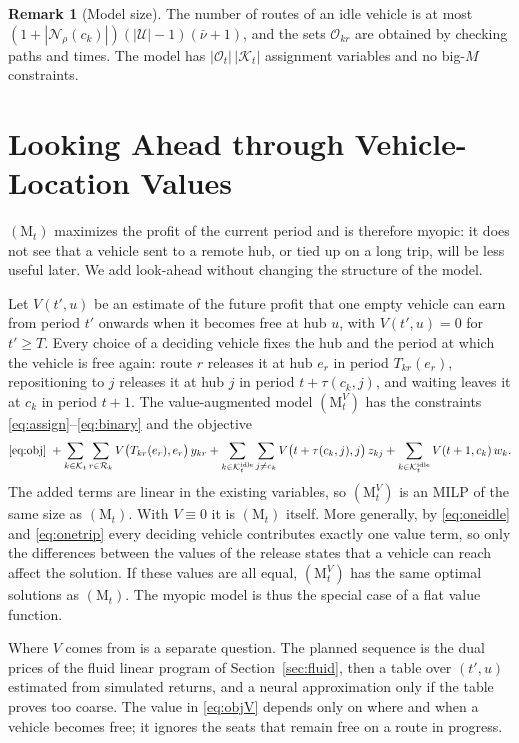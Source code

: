 \documentclass[12pt]{article}
\theoremstyle{plain}
\theoremstyle{definition}
\newtheorem{remark}{Remark}
\newcommand{\Kidle}{\mathcal{K}^{\mathrm{idle}}_t}
\newcommand{\Kdec}{\mathcal{K}_t}
\begin{document}
\begin{remark}[Model size]
The number of routes of an idle vehicle is at most $(1+|\mathcal{N}_\rho(c_k)|)(|\mathcal{U}|-1)(\bar\nu+1)$, and the sets $\mathcal{O}_{kr}$ are obtained by checking paths and times. The model has $|\mathcal{O}_t|\,|\Kdec|$ assignment variables and no big-$M$ constraints.
\end{remark}

\section{Looking Ahead through Vehicle-Location Values}\label{sec:value}

$(\mathrm{M}_t)$ maximizes the profit of the current period and is therefore myopic: it does not see that a vehicle sent to a remote hub, or tied up on a long trip, will be less useful later. We add look-ahead without changing the structure of the model.

Let $V(t',u)$ be an estimate of the future profit that one empty vehicle can earn from period $t'$ onwards when it becomes free at hub $u$, with $V(t',u)=0$ for $t'\ge T$. Every choice of a deciding vehicle fixes the hub and the period at which the vehicle is free again: route $r$ releases it at hub $e_r$ in period $T_{kr}(e_r)$, repositioning to $j$ releases it at hub $j$ in period $t+\tau(c_k,j)$, and waiting leaves it at $c_k$ in period $t+1$. The value-augmented model $(\mathrm{M}^V_t)$ has the constraints \eqref{eq:assign}--\eqref{eq:binary} and the objective
\begin{equation}\label{eq:objV}
\text{\eqref{eq:obj}}\;+\sum_{k\in\Kdec}\sum_{r\in\mathcal{R}_k}V\bigl(T_{kr}(e_r),e_r\bigr)\,y_{kr}
+\sum_{k\in\Kidle}\sum_{j\neq c_k}V\bigl(t+\tau(c_k,j),j\bigr)\,z_{kj}
+\sum_{k\in\Kidle}V(t+1,c_k)\,w_k .
\end{equation}
The added terms are linear in the existing variables, so $(\mathrm{M}^V_t)$ is an MILP of the same size as $(\mathrm{M}_t)$. With $V\equiv 0$ it is $(\mathrm{M}_t)$ itself. More generally, by \eqref{eq:oneidle} and \eqref{eq:onetrip} every deciding vehicle contributes exactly one value term, so only the differences between the values of the release states that a vehicle can reach affect the solution. If these values are all equal, $(\mathrm{M}^V_t)$ has the same optimal solutions as $(\mathrm{M}_t)$. The myopic model is thus the special case of a flat value function.

Where $V$ comes from is a separate question. The planned sequence is the dual prices of the fluid linear program of Section~\ref{sec:fluid}, then a table over $(t',u)$ estimated from simulated returns, and a neural approximation only if the table proves too coarse. The value in \eqref{eq:objV} depends only on where and when a vehicle becomes free; it ignores the seats that remain free on a route in progress.
\end{document}
